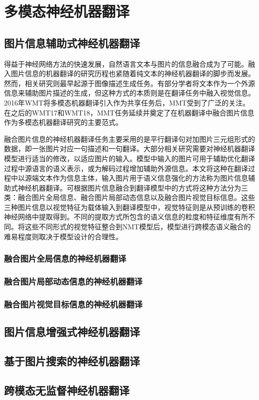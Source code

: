 \section{多模态神经机器翻译}
\subsection{图片信息辅助式神经机器翻译}
得益于神经网络方法的快速发展，自然语言文本与图片的信息融合成为了可能。融入图片信息的机器翻译的研究历程也紧随着纯文本的神经机器翻译的脚步而发展。然而，相关研究则最早起源于图像描述生成任务。有部分学者将文本作为一个外源信息来辅助图片描述的生成，但这种方式的本质则是在翻译任务中融入视觉信息。2016年WMT将多模态机器翻译引入作为共享任务后，MMT受到了广泛的关注。在之后的WMT17和WMT18，MMT任务延续并奠定了在机器翻译中融合图片信息作为多模态机器翻译研究的主要范式。

融合图片信息的神经机器翻译任务主要采用的是平行翻译句对加图片三元组形式的数据，即一张图片对应一句描述和一句翻译。大部分相关研究需要对神经机器翻译模型进行适当的修改，以适应图片的输入。模型中输入的图片可用于辅助优化翻译过程中源语言的语义表示，或为解码过程增加辅助外源信息。本文将这种在翻译过程中以源端文本作为信息主体，输入图片用于语义信息强化的方法称为图片信息辅助式神经机器翻译。可根据图片信息融合到翻译模型中的方式将这种方法分为三类：融合图片全局信息、融合图片局部动态信息以及融合图片视觉目标信息。这些三种图片信息以视觉特征为载体输入到翻译模型中，视觉特征则是从预训练的卷积神经网络中提取得到。不同的提取方式所包含的语义信息的粒度和特征维度有所不同。将这些不同形式的视觉特征整合到NMT模型后，模型进行跨模态语义融合的难易程度则取决于模型设计的合理性。

\subsubsection{融合图片全局信息的神经机器翻译}

\cite{18_DBLP:conf/emnlp/CalixtoL17}
\cite{19_DBLP:conf/acl/CalixtoRA19}
\cite{20_DBLP:conf/acl/WuKBLK20}


\subsubsection{融合图片局部动态信息的神经机器翻译}

\subsubsection{融合图片视觉目标信息的神经机器翻译}

\subsection{图片信息增强式神经机器翻译}

\subsection{基于图片搜索的神经机器翻译}

\subsection{跨模态无监督神经机器翻译}